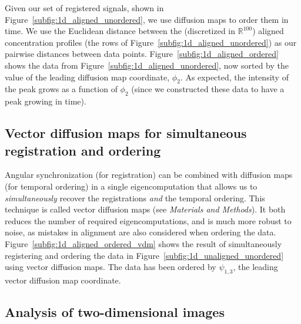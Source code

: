 \documentclass{pnastwo}
\begin{document}
\begin{article}
Given our set of registered signals, shown in Figure~\ref{subfig:1d_aligned_unordered}, we use diffusion maps to order them in time.
%
We use the Euclidean distance between the (discretized in $\mathbb{R}^{100}$) aligned concentration profiles (the rows of Figure~\ref{subfig:1d_aligned_unordered}) as our pairwise distances between data points.
%
Figure~\ref{subfig:1d_aligned_ordered} shows the data from Figure~\ref{subfig:1d_aligned_unordered}, now sorted by the value of the leading diffusion map coordinate, $\phi_2$.
%
As expected, the intensity of the peak grows as a function of $\phi_2$ (since we constructed these data
to have a peak growing in time).
%
%

\subsection{Vector diffusion maps for simultaneous registration and ordering}

%
%
Angular synchronization (for registration) can be combined with diffusion maps (for temporal ordering) in a single eigencomputation that allows us to {\it simultaneously} recover the registrations {\it and} the temporal ordering.
%
This technique is called vector diffusion maps \cite{singer2012vector} (see {\it Materials and Methods}).
%
It both reduces the number of required eigencomputations, and is much more robust to noise, as mistakes in alignment are also considered when ordering the data.
%
Figure~\ref{subfig:1d_aligned_ordered_vdm} shows the result of simultaneously registering and ordering the data in Figure~\ref{subfig:1d_unaligned_unordered} using vector diffusion maps.
%
The data has been ordered by $\psi_{1, 3}$, the leading vector diffusion map coordinate.

\subsection{Analysis of two-dimensional images}


\end{article}
\end{document}
